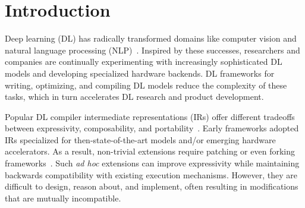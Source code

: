 


  \section{Introduction}
  \label{sec:intro}

  Deep learning (DL) has radically transformed domains like
    computer vision and
    natural language processing (NLP)~\citep{yolo, recent_trends_in_nlp}.
  Inspired by these successes,
    researchers and companies are continually
    experimenting with increasingly sophisticated DL models and
    developing specialized hardware backends.
  DL frameworks for writing, optimizing, and compiling DL models
    reduce the complexity of these tasks,
    which in turn accelerates DL research and product development.

  Popular DL compiler intermediate representations (IRs) offer different tradeoffs
    between expressivity, composability, and portability~\citep{
      tensorflow, pytorch_ad, chainer_learningsys2015, tangent, theano, glow}.
  Early frameworks adopted IRs
    specialized for then-state-of-the-art models and/or
    emerging hardware accelerators.
  As a result, non-trivial extensions require
    patching or even forking frameworks~\citep{
      tf_fold, tf_lite, tangent, tf_eager, xla, glow, torchscript}.
  Such \textit{ad hoc} extensions can improve expressivity
    while maintaining backwards compatibility with existing execution mechanisms.
  However, they are difficult to design, reason about, and implement,
    often resulting in modifications that are mutually incompatible.

